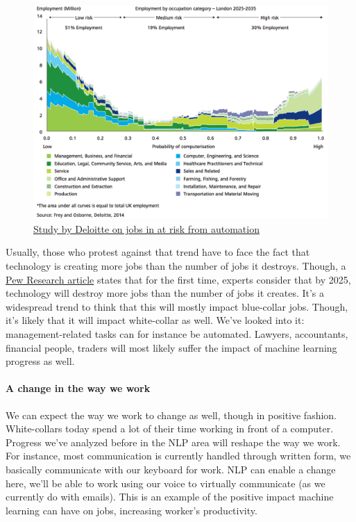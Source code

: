 \documentclass[12pt]{article}
\begin{document}
\smallskip

\begin{figure}[ht]
    \centering
    \includegraphics[scale=0.6]{jobs}
    \caption{\href{http://www2.deloitte.com/content/dam/Deloitte/uk/Documents/uk-futures/london-futures-agiletown.pdf}
    {Study by Deloitte on jobs in at risk from automation}}
    \label{fig:deloitte}
\end{figure}

\smallskip

Usually, those who protest against that trend have to face the fact that
technology is creating more jobs than the number of jobs it destroys. Though, a
\href{http://www.pewinternet.org/2014/08/06/future-of-jobs/}{Pew Research article}
states that for the first time, experts consider that by 2025, technology will
destroy more jobs than the number of jobs it creates. It's a widespread trend to
think that this will mostly impact blue-collar jobs. Though, it's likely that it
will impact white-collar as well. We've looked into it: management-related tasks
can for instance be automated. Lawyers, accountants, financial people, traders will
most likely suffer the impact of machine learning progress as well.



\paragraph{A change in the way we work}

We can expect the way we work to change as well, though in positive fashion.
White-collars today spend a lot of their time working in front of a computer.
Progress we've analyzed before in the NLP area will reshape the way we work. For
instance, most communication is currently handled through written form, we
basically communicate with our keyboard for work. NLP can enable a change here,
we'll be able to work using our voice to virtually communicate (as we currently
do with emails). This is an example of the positive impact machine learning can
have on jobs, increasing worker's productivity.
\end{document}
